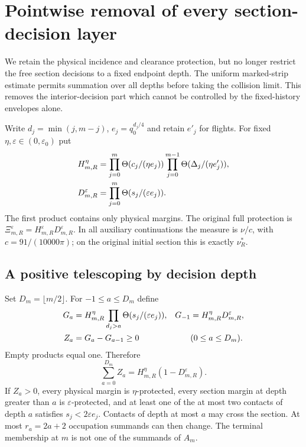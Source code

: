 \section{Pointwise removal of every section-decision layer}
\label{sec:v48-all-decisions}
We retain the physical incidence and clearance protection, but no longer
restrict the free section decisions to a fixed endpoint depth. The
uniform marked-strip estimate permits summation over all depths before
taking the collision limit. This removes the interior-decision part
which cannot be controlled by the fixed-history envelopes alone.

Write $d_j=\min(j,m-j)$, $e_j=q_0^{d_j/4}$ and retain $e'_j$ for
flights. For fixed $\eta,\varepsilon\in(0,\varepsilon_0)$ put
\begin{align}
 H_{m,R}^{\eta}
   &=\prod_{j=0}^m\Theta(c_j/(\eta e_j))
             \prod_{j=0}^{m-1}\Theta(\Delta_j/(\eta e'_j)),\notag\\
 D_{m,R}^{\varepsilon}
   &=\prod_{j=0}^m\Theta(s_j/(\varepsilon e_j)).
                                      \label{eq:v48-physical-decision-guards}
\end{align}
The first product contains only physical margins. The original full
protection is $\Xi_{m,R}^{\varepsilon}=H_{m,R}^{\varepsilon}
D_{m,R}^{\varepsilon}$. In all auxiliary continuations the measure
is $\nu/c$, with $c=91/(10000\pi)$; on the original initial section
this is exactly $\nu_R^*$.

\subsection{A positive telescoping by decision depth}
Set $D_m=\lfloor m/2\rfloor$. For $-1\le a\le D_m$ define
\begin{align}
 G_a&=H_{m,R}^{\eta}\prod_{d_j>a}\Theta(s_j/(\varepsilon e_j)),
       &G_{-1}&=H_{m,R}^{\eta}D_{m,R}^{\varepsilon},\notag\\
 Z_a&=G_a-G_{a-1}\ge0 &&(0\le a\le D_m).
                                      \label{eq:v48-depth-telescope}
\end{align}
Empty products equal one. Therefore
\begin{equation}\label{eq:v48-depth-exact-sum}
 \sum_{a=0}^{D_m}Z_a
       =H_{m,R}^{\eta}(1-D_{m,R}^{\varepsilon}).
\end{equation}
If $Z_a>0$, every physical margin is $\eta$-protected, every
section margin at depth greater than $a$ is $\varepsilon$-protected,
and at least one of the at most two contacts of depth $a$ satisfies
$s_j<2\varepsilon e_j$. Contacts of depth at most $a$ may cross the
section. At most $r_a=2a+2$ occupation summands can then change.
The terminal membership at $m$ is not one of the summands of $A_m$.

